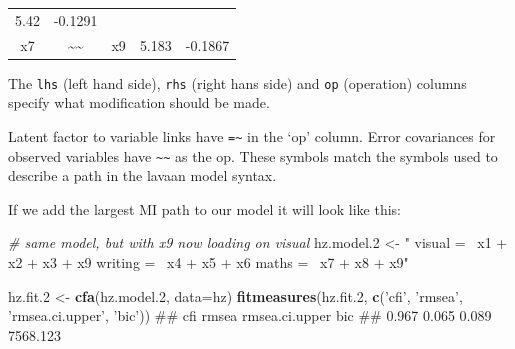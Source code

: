 \documentclass[]{article}
\newenvironment{Shaded}{\begin{snugshade}}{\end{snugshade}}
\newcommand{\KeywordTok}[1]{\textcolor[rgb]{0.13,0.29,0.53}{\textbf{#1}}}
\newcommand{\DataTypeTok}[1]{\textcolor[rgb]{0.13,0.29,0.53}{#1}}
\newcommand{\DecValTok}[1]{\textcolor[rgb]{0.00,0.00,0.81}{#1}}
\newcommand{\StringTok}[1]{\textcolor[rgb]{0.31,0.60,0.02}{#1}}
\newcommand{\CommentTok}[1]{\textcolor[rgb]{0.56,0.35,0.01}{\textit{#1}}}
\newcommand{\NormalTok}[1]{#1}
\theoremstyle{definition}
\theoremstyle{definition}
\theoremstyle{definition}
\theoremstyle{remark}
\begin{document}
\begin{longtable}[]{@{}ccccc@{}}
\begin{minipage}[t]{0.10\columnwidth}
5.42\strut
\end{minipage} & \begin{minipage}[t]{0.11\columnwidth}\centering\strut
-0.1291\strut
\end{minipage}\tabularnewline
\begin{minipage}[t]{0.12\columnwidth}\centering\strut
x7\strut
\end{minipage} & \begin{minipage}[t]{0.06\columnwidth}\centering\strut
\textasciitilde{}\textasciitilde{}\strut
\end{minipage} & \begin{minipage}[t]{0.07\columnwidth}\centering\strut
x9\strut
\end{minipage} & \begin{minipage}[t]{0.10\columnwidth}\centering\strut
5.183\strut
\end{minipage} & \begin{minipage}[t]{0.11\columnwidth}\centering\strut
-0.1867\strut
\end{minipage}\tabularnewline
\bottomrule
\end{longtable}

The \texttt{lhs} (left hand side), \texttt{rhs} (right hans side) and
\texttt{op} (operation) columns specify what modification should be
made.

Latent factor to variable links have \texttt{=\textasciitilde{}} in the
`op' column. Error covariances for observed variables have
\texttt{\textasciitilde{}\textasciitilde{}} as the op. These symbols
match the symbols used to describe a path in the lavaan model syntax.

If we add the largest MI path to our model it will look like this:

\begin{Shaded}
\begin{Highlighting}[]
\CommentTok{# same model, but with x9 now loading on visual}
\NormalTok{hz.model.}\DecValTok{2}\NormalTok{ <-}\StringTok{ "}
\StringTok{visual =~ x1 + x2 + x3 + x9}
\StringTok{writing =~ x4 + x5 + x6}
\StringTok{maths =~ x7 + x8 + x9"}

\NormalTok{hz.fit.}\DecValTok{2}\NormalTok{ <-}\StringTok{ }\KeywordTok{cfa}\NormalTok{(hz.model.}\DecValTok{2}\NormalTok{, }\DataTypeTok{data=}\NormalTok{hz)}
\KeywordTok{fitmeasures}\NormalTok{(hz.fit.}\DecValTok{2}\NormalTok{, }\KeywordTok{c}\NormalTok{(}\StringTok{'cfi'}\NormalTok{, }\StringTok{'rmsea'}\NormalTok{, }\StringTok{'rmsea.ci.upper'}\NormalTok{, }\StringTok{'bic'}\NormalTok{))}
\NormalTok{##            cfi          rmsea rmsea.ci.upper            bic }
\NormalTok{##          0.967          0.065          0.089       7568.123}
\end{Highlighting}
\end{Shaded}
\end{document}
